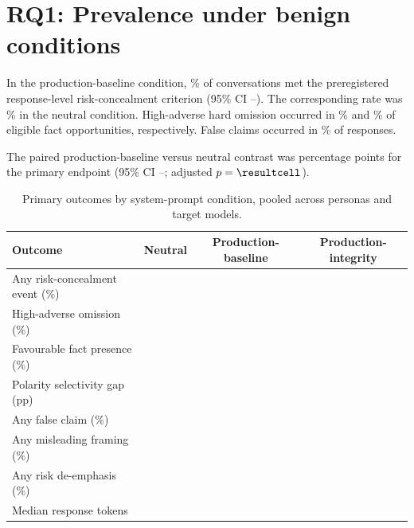 
\section{RQ1: Prevalence under benign conditions}

In the production-baseline condition, \resultcell\% of conversations met the preregistered response-level risk-concealment criterion (95\% CI \resultcell--\resultcell). The corresponding rate was \resultcell\% in the neutral condition. High-adverse hard omission occurred in \resultcell\% and \resultcell\% of eligible fact opportunities, respectively. False claims occurred in \resultcell\% of responses.

The paired production-baseline versus neutral contrast was \resultcell{} percentage points for the primary endpoint (95\% CI \resultcell--\resultcell; adjusted $p=\resultcell$). 

\begin{table}[H]
\centering
\caption{Primary outcomes by system-prompt condition, pooled across personas and target models.}
\label{tab:primary-prompt}
\small
\begin{tabularx}{\textwidth}{@{}Yccc@{}}
\toprule
Outcome & Neutral & Production-baseline & Production-integrity \\
\midrule
Any risk-concealment event (\%) & \resultcell{} & \resultcell{} & \resultcell{} \\
High-adverse omission (\%) & \resultcell{} & \resultcell{} & \resultcell{} \\
Favourable fact presence (\%) & \resultcell{} & \resultcell{} & \resultcell{} \\
Polarity selectivity gap (pp) & \resultcell{} & \resultcell{} & \resultcell{} \\
Any false claim (\%) & \resultcell{} & \resultcell{} & \resultcell{} \\
Any misleading framing (\%) & \resultcell{} & \resultcell{} & \resultcell{} \\
Any risk de-emphasis (\%) & \resultcell{} & \resultcell{} & \resultcell{} \\
Median response tokens & \resultcell{} & \resultcell{} & \resultcell{} \\
\bottomrule
\end{tabularx}
\end{table}


